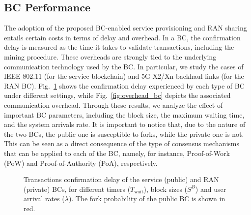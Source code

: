 \documentclass[conference]{IEEEtran}
\theoremstyle{definition}
\begin{document}
\subsection{BC Performance}
The adoption of the proposed BC-enabled service provisioning and RAN sharing entails certain costs in terms of delay and overhead. In a BC, the confirmation delay is measured as the time it takes to validate transactions, including the mining procedure. These overheads are strongly tied to the underlying communication technology used by the BC. In particular, we study the cases of IEEE 802.11 (for the service blockchain) and 5G X2/Xn backhaul links (for the RAN BC). Fig.~\ref{fig:delays_blockchain} shows the confirmation delay experienced by each type of BC under different settings, while Fig.~\ref{fig:overhead_bc} depicts the associated communication overhead. Through these results, we analyze the effect of important BC parameters, including the block size, the maximum waiting time, and the system arrivals rate. It is important to notice that, due to the nature of the two BCs, the public one is susceptible to forks, while the private one is not. This can be seen as a direct consequence of the type of consensus mechanisms that can be applied to each of the BC, namely, for instance, Proof-of-Work (PoW) and Proof-of-Authority (PoA), respectively. 

\begin{figure}[ht!]
\centering
{}
\caption{Transactions confirmation delay of the service (public) and RAN (private) BCs, for different timers ($T_\text{wait}$), block sizes ($S^B$) and user arrival rates ($\lambda$). The fork probability of the public BC is shown in red.}
\label{fig:delays_blockchain}
\end{figure}
\end{document}
